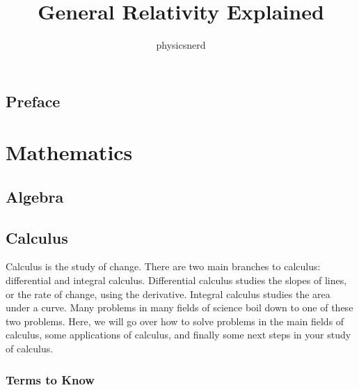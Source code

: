\documentclass{memoir}
\title{General Relativity Explained}
\author{physicsnerd}
\begin{document}
\frontmatter
\maketitle
\tableofcontents
\chapter{Preface}

\mainmatter
\part{Mathematics}
\chapter{Algebra}
\chapter{Calculus}
Calculus is the study of change. 
There are two main branches to calculus: differential and integral calculus. 
Differential calculus studies the slopes of lines, or the rate of change, using the derivative. 
Integral calculus studies the area under a curve. 
Many problems in many fields of science boil down to one of these two problems. 
Here, we will go over how to solve problems in the main fields of calculus, some applications of calculus, and finally some next steps in your study of calculus.

\section{Terms to Know}
\end{document}
